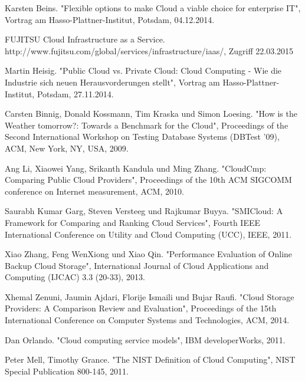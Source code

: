 \ifCLASSOPTIONcaptionsoff
  \newpage
\fi

\begin{thebibliography}{1}

Karsten Beins. "Flexible options to make Cloud a viable choice for enterprise IT", Vortrag am Hasso-Plattner-Institut, Potsdam, 04.12.2014.

FUJITSU Cloud Infrastructure as a Service. http://www.fujitsu.com/global/services/infrastructure/iaas/, Zugriff 22.03.2015
  
Martin Heisig. "Public Cloud vs. Private Cloud: Cloud Computing - Wie die Industrie sich neuen Herausvorderungen stellt", Vortrag am Hasso-Plattner-Institut, Potsdam, 27.11.2014.

Carsten Binnig, Donald Kossmann, Tim Kraska und Simon Loesing. "How is the Weather tomorrow?: Towards a Benchmark for the Cloud", Proceedings of the Second International Workshop on Testing Database Systems (DBTest '09), ACM, New York, NY, USA, 2009.

Ang Li, Xiaowei Yang, Srikanth Kandula und Ming Zhang. "CloudCmp: Comparing Public Cloud Providers", Proceedings of the 10th ACM SIGCOMM conference on Internet measurement, ACM, 2010.

Saurabh Kumar Garg, Steven Versteeg und Rajkumar Buyya. "SMICloud: A Framework for Comparing and Ranking Cloud Services", Fourth IEEE International Conference on Utility and Cloud Computing (UCC), IEEE, 2011.

Xiao Zhang, Feng WenXiong und Xiao Qin. "Performance Evaluation of Online Backup Cloud Storage", International Journal of Cloud Applications and Computing (IJCAC) 3.3 (20-33), 2013.

Xhemal Zenuni, Jaumin Ajdari, Florije Ismaili und Bujar Raufi. "Cloud Storage Providers: A Comparison Review and Evaluation", Proceedings of the 15th International Conference on Computer Systems and Technologies, ACM, 2014.

Dan Orlando. "Cloud computing service models", IBM developerWorks, 2011.

Peter Mell, Timothy Grance. "The NIST Definition of Cloud Computing", NIST Special Publication 800-145, 2011.


\end{thebibliography}
